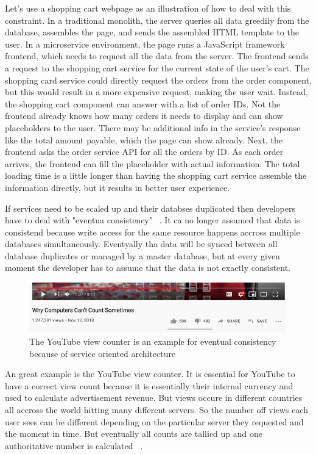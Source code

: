 Let's use a shopping cart webpage as an illustration of how to deal with this constraint. In a traditional monolith, the server queries all data greedily from the database, assembles the page, and sends the assembled HTML template to the user. In a microservice environment, the page runs a JavaScript framework frontend, which needs to request all the data from the server. The frontend sends a request to the shopping cart service for the current state of the user's cart. The shopping card service could directly request the orders from the order component, but this would result in a more expensive request, making the user wait. Instead, the shopping cart component can answer with a list of order IDs. Not the frontend already knows how many orders it needs to display and can show placeholders to the user. There may be additional info in the service's response like the total amount payable, which the page can show already. Next, the frontend asks the order service API for all the orders by ID. As each order arrives, the frontend can fill the placeholder with actual information. The total loading time is a little longer than having the shopping cart service assemble the information directly, but it results in better user experience.

If services need to be scaled up and their databses duplicated then developers have to deal with "eventua consistency" ~\cite{fowler.2015}. It ca no longer assumed that data is consistend because write access for the same resource happens accross multiple databases simultaneously. Eventyally tha data will be synced between all database duplicates or managed by a master database, but at every given moment the developer has to assume that the data is not exactly consistent.

\begin{figure}[ht]
  \centering
  \includegraphics[width=0.70\linewidth]{assets/youtube-view-counter.png}
  \caption{The YouTube view counter is an example for eventual consistency because of service oriented architecture}
\end{figure}

An great example is the YouTube view counter. It is essential for YouTube to have a correct view count because it is essentially their internal currency and used to calculate advertisement revenue. But views occure in different countries all accross the world hitting many different servers. So the number off views each user sees can be different depending on the particular server they requested and the moment in time. But eventually all counts are tallied up and one authoritative number is calculated
~\cite{scott.2018}.


